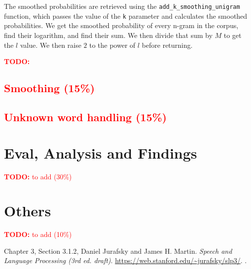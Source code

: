 \documentclass[a4paper]{article}
\newcommand{\todo}[1]{\textcolor{red}{\textbf{TODO:} #1}}
\begin{document}
The smoothed probabilities are retrieved using the \texttt{add\_k\_smoothing\_unigram} function, which passes the value of the \texttt{k} parameter and calculates the smoothed probabilities. We get the smoothed probability of every n-gram in the corpus, find their logarithm, and find their sum. We then divide that sum by $M$ to get the $l$ value. We then raise $2$ to the power of $l$ before returning.  

\todo{
    \subsection{Smoothing (15\%)}
    \subsection{Unknown word handling (15\%)}
}


\section{Eval, Analysis and Findings}
\todo{to add (30\%)}


\section{Others}
\todo{to add (10\%)}

\newpage
\begin{thebibliography}{9}

Chapter 3, Section 3.1.2, Daniel Jurafsky and James H. Martin.
\newblock \textit{Speech and Language Processing (3rd ed. draft)}.
\newblock \url{https://web.stanford.edu/~jurafsky/slp3/}.
.

\end{thebibliography}
\end{document}
